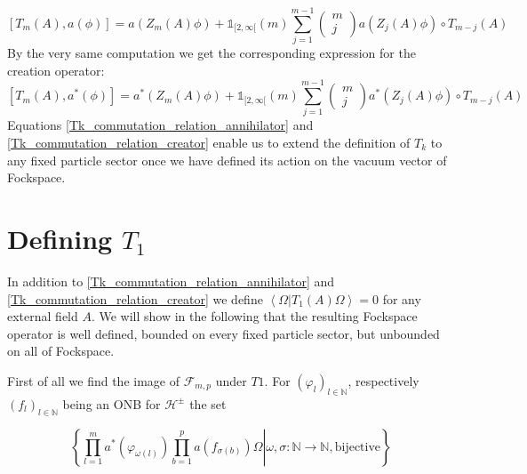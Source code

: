 \documentclass[a4paper,12pt]{article}
\begin{document}
\begin{equation}\label{Tk_commutation_relation_annihilator}
\left[T_m(A) , a(\phi)\right]= a\left(Z_m (A) \phi \right) + \mathds{1}_{[2,\infty[}(m)\sum_{j=1}^{m-1} \begin{pmatrix} m \\ j \end{pmatrix} a\left(Z_j (A) \phi \right)\circ T_{m-j}(A)
\end{equation}
By the very same computation we get the corresponding expression for the creation operator:
\begin{equation}\label{Tk_commutation_relation_creator}
\left[T_m(A) , a^*(\phi)\right]= a^*\left(Z_m (A) \phi \right) + \mathds{1}_{[2,\infty[}(m)\sum_{j=1}^{m-1} \begin{pmatrix} m \\ j \end{pmatrix} a^*\left(Z_j (A) \phi \right)\circ T_{m-j}(A)
\end{equation}
Equations \eqref{Tk_commutation_relation_annihilator} and \eqref{Tk_commutation_relation_creator} enable us to extend the definition of \(T_k\) to any fixed particle sector once we have defined its action on the vacuum vector of Fockspace.

\section{Defining \(T_1\)}

In addition to \eqref{Tk_commutation_relation_annihilator} and \eqref{Tk_commutation_relation_creator} we define \(\left<\Omega \right| \left. T_1(A) \Omega\right>=0\) for any external field \(A\). We will show in the following that the resulting Fockspace operator is well defined, bounded on every fixed particle sector, but unbounded on all of Fockspace.

First of all we find the image of \(\mathcal{F}_{m,p}\) under \(T1\). For \(\left( \varphi_l \right)_{l\in\mathbb{N}} \), respectively \(\left( f_l \right)_{l\in\mathbb{N}} \)  being an ONB for \(\mathcal{H}^\pm\) the set 

\begin{equation}\label{F_m,p basis}
\left\{\left. \prod_{l=1}^m a^*(\varphi_{\omega(l)}) \prod_{b=1}^p a(f_{\sigma(b)}) \Omega \right| \omega,\sigma: \mathbb{N} \rightarrow \mathbb{N}, \text{bijective} \right\}
\end{equation}
\end{document}
